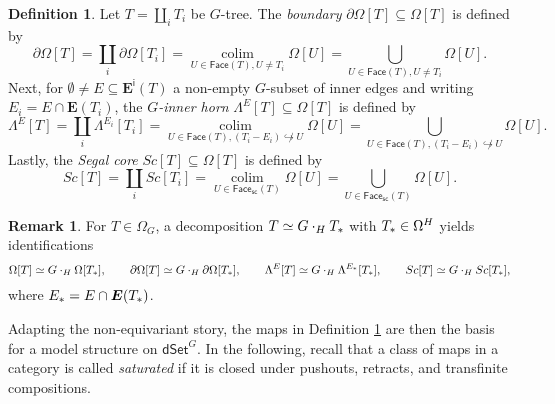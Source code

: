 \documentclass[a4paper,10pt
,draft
]{article}%
\numberwithin{equation}{section}
\numberwithin{figure}{section}
\theoremstyle{definition} %
\newtheorem{definition}[equation]{Definition}%
\newtheorem{remark}[equation]{Remark}%
\newcommand{\into}{\hookrightarrow}%
\newcommand{\dSet}{\mathsf{dSet}}
\DeclareMathOperator{\colim}{colim}%
\newcommand{\1}{\ensuremath{\mathbbm 1}}%
\begin{document}
\begin{definition}\label{DSETPRESHEAF_DEF}
      Let $T = \amalg_i T_i$ be $G$-tree.
      The \emph{boundary}
      $\partial \Omega[T] \subseteq \Omega[T]$ is defined by
      \begin{equation}
            \partial \Omega[T]
            = \coprod_i \partial \Omega[T_i]
            = \mathop{\colim}\limits_{U \in \mathsf{Face}(T), U \neq T_i} \Omega[U]
            = \bigcup_{U \in \mathsf{Face}(T), U \neq T_i} \Omega[U].
      \end{equation}
      Next, for $\emptyset \neq E \subseteq \boldsymbol{E}^{\mathsf{i}}(T)$ a non-empty $G$-subset of inner edges and writing $E_i = E \cap \boldsymbol{E}(T_i)$,
      the \textit{$G$-inner horn} 
      $\Lambda^E[T] \subseteq \Omega[T]$ is defined by
      \begin{equation}\label{GINNERHORN_EQ}
            \Lambda^{E}[T]
            = \coprod_i \Lambda^{E_i}[T_i]
            = \mathop{\colim}\limits_{U \in \mathsf{Face}(T), (T_i - E_i) \not\into U} \Omega[U]
            = \bigcup_{U \in \mathsf{Face}(T), (T_i - E_i) \not\into U} \Omega[U].
      \end{equation}
      Lastly, the \textit{Segal core} $Sc[T] \subseteq \Omega[T]$ is defined by
      \begin{equation}\label{eq:SC}
              Sc[T] 
              = \coprod_i Sc[T_i]
              = \mathop{\colim}\limits_{U \in \mathsf{Face}_{\mathsf{sc}}(T)} \Omega[U]
              = \bigcup_{U \in \mathsf{Face}_{\mathsf{sc}}(T)} \Omega[U].
      \end{equation}
\end{definition}


\begin{remark}
For $T \in \Omega_G$, a decomposition $T \simeq G \cdot_H T_{\**}$ with $T_{\**} \in \Omega^H$ yields identifications
\[
	\Omega[T] \simeq G \cdot_H \Omega[T_{\**}],
\qquad
	\partial\Omega[T] \simeq G \cdot_H \partial \Omega[T_{\**}],
\qquad
	\Lambda^{E}[T] \simeq G \cdot_H \Lambda^{E_{\**}}[T_{\**}],
\qquad
	Sc[T] \simeq G \cdot_H Sc[T_{\**}],
\]
where $E_{\**} = E \cap \boldsymbol{E}(T_{\**})$.
\end{remark}



Adapting the non-equivariant story, the maps in Definition \ref{DSETPRESHEAF_DEF} are then the basis for a model structure on $\dSet^G$.
%
In the following, recall that a class of maps in a category is called \textit{saturated} if it is closed under pushouts, retracts, and transfinite compositions.
\end{document}
